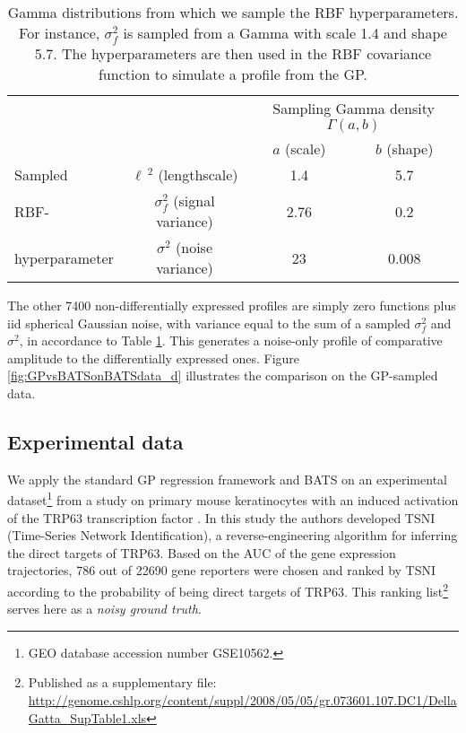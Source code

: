 	\begin{table}[!htbp]
	  \begin{tabular}{cc|c|c|}
	    \cline{3-4}
	    & & \multicolumn{2}{|c|}{Sampling Gamma density $\Gamma(a,b)$} \\
	    \cline{3-4} & & $a$ (scale) & $b$ (shape) \\ \hline
	    \multicolumn{1}{|l|}{Sampled} & \multicolumn{1}{|c|}{$\ell\,^2$
	    (lengthscale)} & 1.4  & 5.7  \\ \cline{2-4}
	    \multicolumn{1}{|l|}{RBF-} & \multicolumn{1}{|c|}{$\sigma_f^2$ (signal
	    variance)} & 2.76  & 0.2 \\ \cline{2-4}
	    \multicolumn{1}{|l|}{hyperparameter} & \multicolumn{1}{|c|}{$\sigma^2$
	    (noise variance)} & 23 & 0.008 \\ \hline
	  \end{tabular}
	  \caption[Gamma distributions for sampling RBF kernel hyperparameters.] {
	    Gamma distributions from which we sample the RBF hyperparameters. For instance, $\sigma^2_f$
	    is sampled from a Gamma with scale 1.4 and shape 5.7.
	    The hyperparameters are then used in the  RBF covariance function to simulate a profile from the GP.}
	  \label{table:GammaParams}
	\end{table}

	The other 7400 non-differentially expressed profiles are simply zero
	functions plus iid spherical Gaussian noise, with variance equal to the sum of a sampled
	$\sigma^2_f$ and $\sigma^2$, in accordance to Table \ref{table:GammaParams}. This generates a noise-only profile
	of comparative amplitude to the differentially expressed ones.
	Figure \ref{fig:GPvsBATSonBATSdata_d} illustrates the comparison on the GP-sampled data.

    \subsection{Experimental data} \label{subsec:chap2_expdata}
      We apply the standard GP regression framework and BATS on an experimental
      dataset\footnote{GEO database accession number GSE10562.} from a study on primary mouse keratinocytes with an induced
      activation of the TRP63 transcription factor \citep{della2008direct}.
      In this study the authors developed TSNI (Time-Series Network
      Identification), a reverse-engineering algorithm for inferring the  direct targets
      of TRP63. Based on the AUC of the gene expression trajectories, 786 out of
      22690 gene reporters were chosen and ranked by TSNI according to the probability of being direct targets of TRP63.
      This ranking list\footnote{Published as a supplementary file:
      \url{http://genome.cshlp.org/content/suppl/2008/05/05/gr.073601.107.DC1/DellaGatta_SupTable1.xls}} 
      serves here as a \textit{noisy ground truth}.

